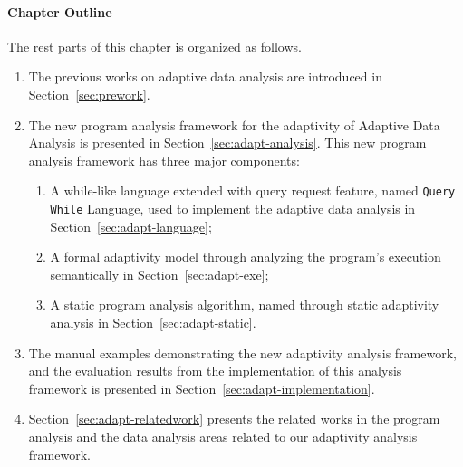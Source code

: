 \paragraph*{Chapter Outline}
The rest parts of this chapter is organized as follows. 
\begin{enumerate}
   \item The previous works on adaptive data analysis are introduced in Section~\ref{sec:prework}.
   \item The new program analysis framework for the adaptivity of Adaptive Data Analysis is presented 
   in Section~\ref{sec:adapt-analysis}.
   This new program analysis framework has three major components:
   \begin{enumerate}
      \item A while-like language extended with query request feature, named {\tt Query While} Language, 
      used to implement the adaptive data analysis in Section~\ref{sec:adapt-language};
      \item A formal adaptivity model through analyzing the program's execution semantically in Section~\ref{sec:adapt-exe};
      \item A static program analysis algorithm, named {\THESYSTEM} through static adaptivity analysis in Section~\ref{sec:adapt-static}.
   \end{enumerate}
   \item The manual examples demonstrating the new adaptivity analysis framework,
   and the evaluation results from the implementation
   of this analysis framework is presented in Section~\ref{sec:adapt-implementation}.
   \item Section~\ref{sec:adapt-relatedwork} presents the related works in the program analysis and the data analysis areas
   related to our adaptivity analysis framework.
\end{enumerate}


